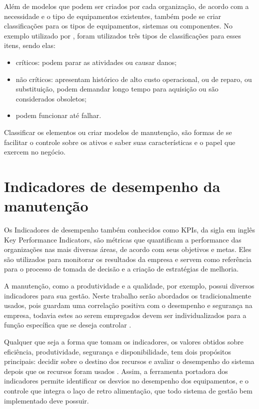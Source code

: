 Além de modelos que podem ser criados por cada organização, de acordo com a necessidade e o tipo de equipamentos existentes, também pode se criar classificações para os tipos de equipamentos, sistemas ou componentes. No exemplo utilizado por \cite{valeria2013}, foram utilizados três tipos de classificações para esses itens, sendo elas:

\begin{itemize}
	\item críticos: podem parar as atividades ou causar danos;
	\item não críticos: apresentam histórico de alto custo operacional, ou de reparo, ou substituição, podem demandar longo tempo para aquisição ou são considerados obsoletos;
	\item podem funcionar até falhar.
\end{itemize}

Classificar os elementos ou criar modelos de manutenção, são formas de se facilitar o controle sobre os ativos e saber suas características e o papel que exercem no negócio.

\section{Indicadores de desempenho da manutenção}

Os Indicadores de desempenho também conhecidos como KPIs, da sigla em inglês Key Performance Indicators, são métricas que quantificam a performance das organizações nas mais diversas áreas, de acordo com seus objetivos e metas. Eles são utilizados para monitorar os resultados da empresa e servem como referência para o processo de tomada de decisão e a criação de estratégias de melhoria. 

A manutenção, como a produtividade e a qualidade, por exemplo, possui diversos indicadores para sua gestão. Neste trabalho serão abordados os tradicionalmente usados, pois guardam uma correlação positiva com o desempenho e segurança na empresa, todavia estes ao serem empregados devem ser individualizados para a função específica que se deseja controlar \cite{martorell1999}. 

Qualquer que seja a forma que tomam os indicadores, os valores obtidos sobre eficiência, produtividade, segurança e disponibilidade, tem dois propósitos principais: decidir sobre o destino dos recursos e avaliar o desempenho do sistema depois que os recursos foram usados \cite{lofsten1998}. Assim, a ferramenta portadora dos indicadores permite identificar os desvios no desempenho dos equipamentos, e o controle que integra o laço de retro alimentação, que todo sistema de gestão bem implementado deve possuir. 

